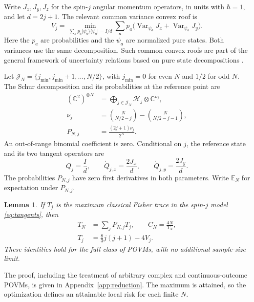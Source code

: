 \documentclass[aps,pra,reprint,superscriptaddress,longbibliography]{revtex4-2}
\newtheorem{lemma}[theorem]{Lemma}
\theoremstyle{remark}
\DeclareMathOperator{\Var}{Var}
\newcommand{\E}{\mathbb E}
\newcommand{\C}{\mathbb C}
\newcommand{\ket}[1]{\lvert#1\rangle}
\newcommand{\bra}[1]{\langle#1\rvert}
\begin{document}
Write $J_x,J_y,J_z$ for the spin-$j$ angular momentum operators,
in units with $\hbar=1$, and let $d=2j+1$. The relevant common
variance convex roof is
\begin{equation}
 V_j=\min_{\sum_a p_a\ket{\psi_a}\bra{\psi_a}=I/d}
 \sum_a p_a\bigl(\Var_{\psi_a}J_x+\Var_{\psi_a}J_y\bigr).
 \label{eq:roof}
\end{equation}
Here the $p_a$ are probabilities and the $\psi_a$ are normalized pure
states. Both variances use the same decomposition. Such common convex roofs are
part of the general framework of uncertainty relations based on pure
state decompositions \cite{TothFrowis2022}.

Let $\mathcal J_N=\{j_{\min},j_{\min}+1,\ldots,N/2\}$, with
$j_{\min}=0$ for even $N$ and $1/2$ for odd $N$. The Schur decomposition
and its probabilities at the reference point are
\begin{equation}
\begin{aligned}
(\C^2)^{\otimes N}
 &=\bigoplus_{j\in\mathcal J_N}\mathcal H_j\otimes\C^{\nu_j},\\
\nu_j&=\binom N{N/2-j}-\binom N{N/2-j-1},\\
P_{N,j}&=\frac{(2j+1)\nu_j}{2^N}.
\end{aligned}
\label{eq:schur}
\end{equation}
An out-of-range binomial coefficient is zero. Conditional on $j$, the
reference state and its two tangent operators are
\begin{equation}
 Q_j=\frac{I}{d},\qquad \dot Q_{j,x}=\frac{2J_x}{d},\qquad
 \dot Q_{j,y}=\frac{2J_y}{d}.
 \label{eq:tangents}
\end{equation}
The probabilities $P_{N,j}$ have zero first derivatives in both
parameters. Write $\E_N$ for expectation under $P_{N,j}$.

\begin{lemma}\label{lem:reduction}
If $T_j$ is the maximum classical Fisher trace in the spin-$j$ model
\eqref{eq:tangents}, then
\begin{equation}
\begin{aligned}
T_N&=\sum_jP_{N,j}T_j,\qquad C_N=\frac{4N}{T_N},\\
T_j&=\frac83j(j+1)-4V_j.
\end{aligned}
\label{eq:reductions}
\end{equation}
These identities hold for the full class of POVMs, with no additional
sample-size limit.
\end{lemma}

The proof, including the treatment of arbitrary complex and
continuous-outcome POVMs, is given in Appendix~\ref{app:reduction}.
The maximum is attained, so the optimization defines an
attainable local risk for each finite $N$.
\end{document}
